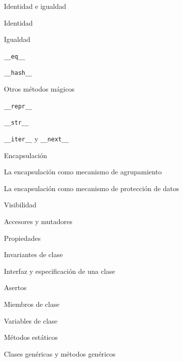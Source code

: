 \begin{longenum}
    \begin{longenum}
        \item Identidad e igualdad
        \begin{longenum}
            \item Identidad
            \item Igualdad
            \begin{longenum}
                \item \texttt{\_\_eq\_\_}
                \item \texttt{\_\_hash\_\_}
            \end{longenum}
            \item Otros métodos mágicos
            \begin{longenum}
                \item \texttt{\_\_repr\_\_}
                \item \texttt{\_\_str\_\_}
                \item \texttt{\_\_iter\_\_} y \texttt{\_\_next\_\_}
            \end{longenum}
        \end{longenum}
        \item Encapsulación
        \begin{longenum}
            \item La encapsulación como mecanismo de agrupamiento
            \item La encapsulación como mecanismo de protección de datos
            \begin{longenum}
                \item Visibilidad
                \item Accesores y mutadores
                \item Propiedades
                \item Invariantes de clase
                \item Interfaz y especificación de una clase
                \item Asertos
            \end{longenum}
        \end{longenum}
        \item Miembros de clase
        \begin{longenum}
            \item Variables de clase
            \item Métodos estáticos
        \end{longenum}
        \item Clases genéricas y métodos genéricos

\end{longenum}
\end{longenum}
